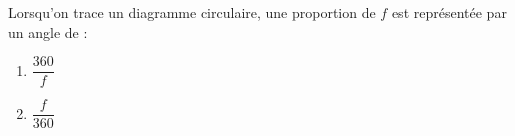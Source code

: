 
\begin{exercice}\label{exo2smath-0241}

    Lorsqu'on trace un diagramme circulaire, une proportion de \( f\) est représentée par un angle de :
    \begin{enumerate}
        \item
            \( \dfrac{ 360 }{ f }\)
        \item
            \( \dfrac{ f }{ 360 }\)
    \end{enumerate}

\end{exercice}
